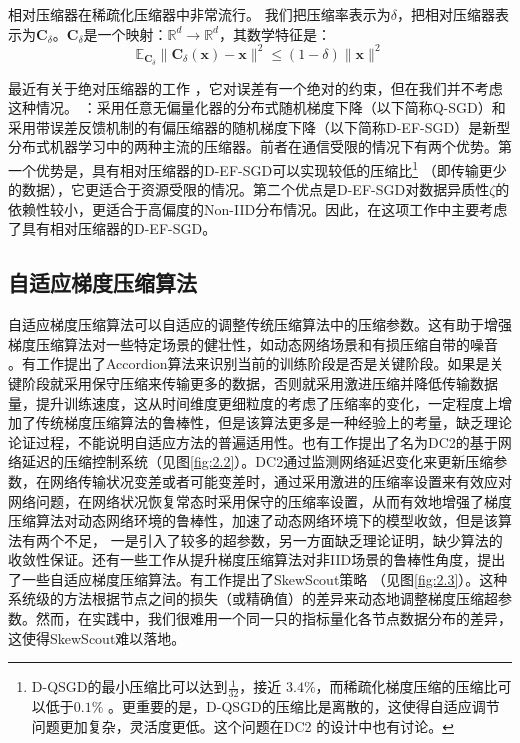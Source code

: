 相对压缩器在稀疏化压缩器中非常流行\cite{stich2020communication,stich2019error,aji2017sparse}。 我们把压缩率表示为$\delta$，把相对压缩器表示为$\textbf{C}_{\delta}$。$\textbf{C}_{\delta}$是一个映射：$\mathbb{R}^d \rightarrow \mathbb{R}^d$，其数学特征是：
\begin{equation}
    \mathbb{E}_{\textbf{C}_{\delta}}\lVert \textbf{C}_{\delta}(\textbf{x}) - \textbf{x} \rVert^2 \leq (1-\delta) \lVert \textbf{x} \rVert^2 \nonumber
\end{equation}

最近有关于绝对压缩器的工作 \cite{hardthreshold}，它对误差有一个绝对的约束，但在我们并不考虑这种情况。
：采用任意无偏量化器的分布式随机梯度下降（以下简称Q-SGD）和采用带误差反馈机制的有偏压缩器的随机梯度下降（以下简称D-EF-SGD）\cite{cui2021slashing,QuantityGlobal}是新型分布式机器学习中的两种主流的压缩器。前者在通信受限的情况下有两个优势。第一个优势是，具有相对压缩器的D-EF-SGD可以实现较低的压缩比\footnote{D-QSGD的最小压缩比可以达到$\frac{1}{32}$\cite{signsgd,qsgd}，接近 $3.4\%$，而稀疏化梯度压缩的压缩比可以低于$0.1\%$ \cite{aji2017sparse}。更重要的是，D-QSGD的压缩比是离散的，这使得自适应调节问题更加复杂，灵活度更低。这个问题在DC2 \cite{dc2}的设计中也有讨论。} （即传输更少的数据），它更适合于资源受限的情况。第二个优点是D-EF-SGD对数据异质性$\zeta$的依赖性较小，更适合于高偏度的Non-IID分布情况\cite{stich2020communication}。因此，在这项工作中主要考虑了具有相对压缩器的D-EF-SGD。


 
\subsection{自适应梯度压缩算法}

自适应梯度压缩算法可以自适应的调整传统压缩算法中的压缩参数。这有助于增强梯度压缩算法对一些特定场景的健壮性，如动态网络场景和有损压缩自带的噪音 \cite{AdaQS,PASGD}。有工作\cite{accordion}提出了Accordion算法来识别当前的训练阶段是否是关键阶段。如果是关键阶段就采用保守压缩来传输更多的数据，否则就采用激进压缩并降低传输数据量，提升训练速度，这从时间维度更细粒度的考虑了压缩率的变化，一定程度上增加了传统梯度压缩算法的鲁棒性，但是该算法更多是一种经验上的考量，缺乏理论论证过程，不能说明自适应方法的普遍适用性。也有工作\cite{dc2}提出了名为DC2的基于网络延迟的压缩控制系统（见图\ref{fig:2.2}）。DC2通过监测网络延迟变化来更新压缩参数，在网络传输状况变差或者可能变差时，通过采用激进的压缩率设置来有效应对网络问题，在网络状况恢复常态时采用保守的压缩率设置，从而有效地增强了梯度压缩算法对动态网络环境的鲁棒性，加速了动态网络环境下的模型收敛，但是该算法有两个不足，
一是引入了较多的超参数，另一方面缺乏理论证明，缺少算法的收敛性保证。还有一些工作从提升梯度压缩算法对非IID场景的鲁棒性角度，提出了一些自适应梯度压缩算法。有工作\cite{niid2020icml}提出了SkewScout策略 （见图\ref{fig:2.3}）。这种系统级的方法根据节点之间的损失（或精确值）的差异来动态地调整梯度压缩超参数。然而，在实践中，我们很难用一个同一只的指标量化各节点数据分布的差异，这使得SkewScout难以落地。

